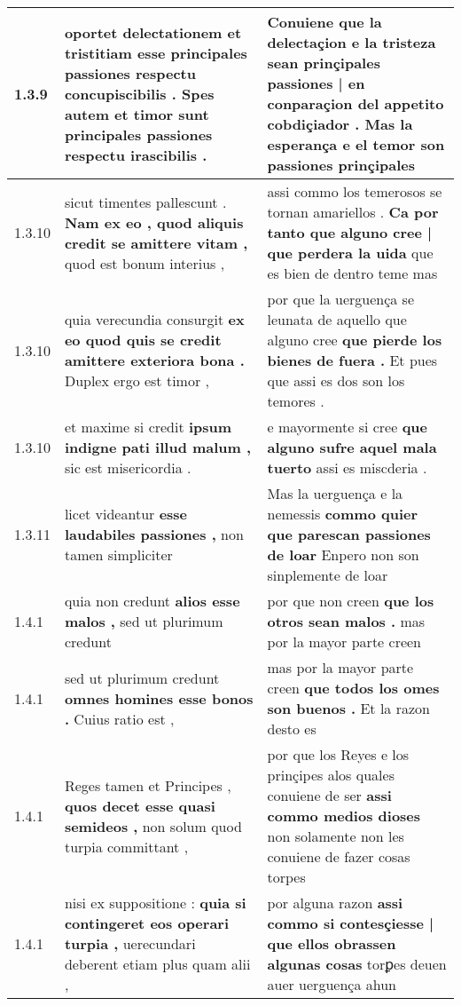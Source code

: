 \begin{tabular}{|p{1cm}|p{6.5cm}|p{6.5cm}|}
1.3.9 & oportet delectationem et tristitiam \textbf{ esse principales passiones respectu concupiscibilis . } Spes autem et timor sunt principales passiones respectu irascibilis . & Conuiene que la delectaçion e la tristeza \textbf{ sean prinçipales passiones | en conparaçion del appetito cobdiçiador . } Mas la esperança e el temor son passiones prinçipales \\\hline
1.3.10 & sicut timentes pallescunt . \textbf{ Nam ex eo , quod aliquis credit se amittere vitam , } quod est bonum interius , & assi commo los temerosos se tornan amariellos . \textbf{ Ca por tanto que alguno cree | que perdera la uida } que es bien de dentro teme mas \\\hline
1.3.10 & quia verecundia consurgit \textbf{ ex eo quod quis se credit amittere exteriora bona . } Duplex ergo est timor , & por que la uerguença se leunata de aquello que alguno cree \textbf{ que pierde los bienes de fuera . } Et pues que assi es dos son los temores . \\\hline
1.3.10 & et maxime si credit \textbf{ ipsum indigne pati illud malum , } sic est misericordia . & e mayormente si cree \textbf{ que alguno sufre aquel mala tuerto } assi es miscderia . \\\hline
1.3.11 & licet videantur \textbf{ esse laudabiles passiones , } non tamen simpliciter & Mas la uerguença e la nemessis \textbf{ commo quier que parescan passiones de loar } Enpero non son sinplemente de loar \\\hline
1.4.1 & quia non credunt \textbf{ alios esse malos , } sed ut plurimum credunt & por que non creen \textbf{ que los otros sean malos . } mas por la mayor parte creen \\\hline
1.4.1 & sed ut plurimum credunt \textbf{ omnes homines esse bonos . } Cuius ratio est , & mas por la mayor parte creen \textbf{ que todos los omes son buenos . } Et la razon desto es \\\hline
1.4.1 & Reges tamen et Principes , \textbf{ quos decet esse quasi semideos , } non solum quod turpia committant , & por que los Reyes e los prinçipes alos quales conuiene de ser \textbf{ assi commo medios dioses } non solamente non les conuiene de fazer cosas torpes \\\hline
1.4.1 & nisi ex suppositione : \textbf{ quia si contingeret eos operari turpia , } uerecundari deberent etiam plus quam alii , & por alguna razon \textbf{ assi commo si contesçiesse | que ellos obrassen algunas cosas } torꝑes deuen auer uerguença ahun \\\hline

\end{tabular}
